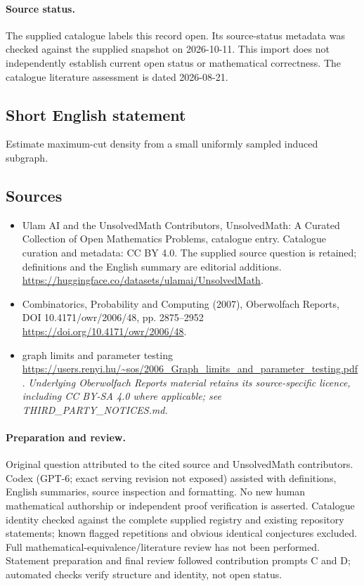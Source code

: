 \documentclass[11pt]{article}
\begin{document}
\paragraph{Source status.}
The supplied catalogue labels this record open. Its source-status metadata was checked against the supplied snapshot on 2026-10-11. This import does not independently establish current open status or mathematical correctness. The catalogue literature assessment is dated 2026-08-21.
\subsection{Short English statement}
Estimate maximum-cut density from a small uniformly sampled induced subgraph.
\subsection{Sources}
\begin{itemize}
\item[S1] Ulam AI and the UnsolvedMath Contributors, UnsolvedMath: A Curated Collection of Open Mathematics Problems, catalogue entry. Catalogue curation and metadata: CC BY 4.0. The supplied source question is retained; definitions and the English summary are editorial additions.
\url{https://huggingface.co/datasets/ulamai/UnsolvedMath}.
\item[S2] Combinatorics, Probability and Computing (2007), Oberwolfach Reports, DOI 10.4171/owr/2006/48, pp. 2875--2952
\url{https://doi.org/10.4171/owr/2006/48}.
\item[S3] graph limits and parameter testing
\url{https://users.renyi.hu/~sos/2006_Graph_limits_and_parameter_testing.pdf}.
\textit{Underlying Oberwolfach Reports material retains its source-specific licence, including CC BY-SA 4.0 where applicable; see THIRD\_PARTY\_NOTICES.md.}
\end{itemize}
\paragraph{Preparation and review.}
Original question attributed to the cited source and UnsolvedMath contributors. Codex (GPT-6; exact serving revision not exposed) assisted with definitions, English summaries, source inspection and formatting. No new human mathematical authorship or independent proof verification is asserted. Catalogue identity checked against the complete supplied registry and existing repository statements; known flagged repetitions and obvious identical conjectures excluded. Full mathematical-equivalence/literature review has not been performed. Statement preparation and final review followed contribution prompts C and D; automated checks verify structure and identity, not open status.
\label{end:statement}
\end{document}
